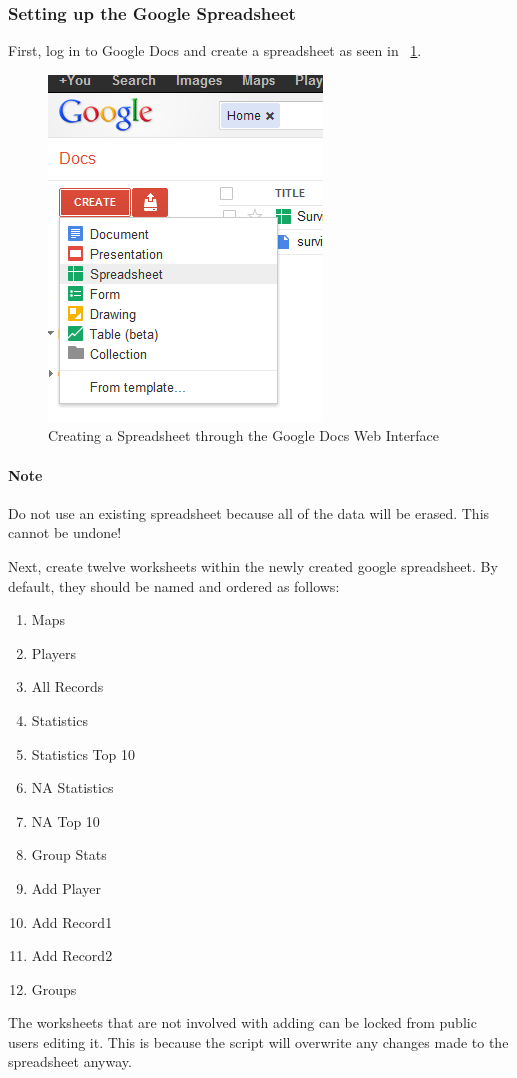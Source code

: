 \subsubsection{Setting up the Google Spreadsheet}
First, log in to Google Docs and create a spreadsheet as seen in \figurename\ \ref{fig:create_spreadsheet}.
\begin{figure}[htb]
\centering
\includegraphics[width=0.40\columnwidth]{create_spreadsheet}
\caption{Creating a Spreadsheet through the Google Docs Web Interface}
\label{fig:create_spreadsheet}
\end{figure}
\paragraph{Note} Do not use an existing spreadsheet because all of the data will be erased. This cannot be undone!

Next, create twelve worksheets within the newly created google spreadsheet. By default, they should be named and ordered as follows:
\begin{enumerate}
\item Maps
\item Players
\item All Records
\item Statistics
\item Statistics Top 10
\item NA Statistics
\item NA Top 10
\item Group Stats
\item Add Player
\item Add Record1
\item Add Record2
\item Groups
\end{enumerate}
The worksheets that are not involved with adding can be locked from public users editing it. This is because the script will overwrite any changes made to the spreadsheet anyway.

